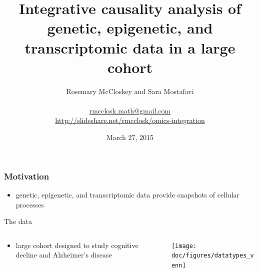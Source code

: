 \documentclass{beamer}
\title[Omics data integration]{Integrative causality analysis of genetic,
epigenetic, and transcriptomic data in a large cohort}
\author[R. McCloskey \& S. Mostafavi]
    {Rosemary McCloskey and Sara Mostafavi \\\hfill\\
     \small
     \url{rmcclosk.math@gmail.com} \\
     \url{http://slideshare.net/rmcclosk/omics-integration}
     \normalsize}
\date{March 27, 2015}
\begin{document}
\maketitle

\begin{frame}
    \frametitle{Motivation}
    \begin{itemize}
        \item genetic, epigenetic, and transcriptomic data provide snapshots of
            cellular processes
    \begin{center}
        \vspace{-0.5cm}
        
    \end{center}
    \end{itemize}
\end{frame}

\begin{frame}{The data}
    \begin{columns}
        \begin{column}{0.35\textwidth}
            \begin{itemize}
                \item large cohort designed to study cognitive decline and
                    Alzheimer's disease
            \end{itemize}
        \end{column}
        \begin{column}{0.7\textwidth}
            \texttt{[image: doc/figures/datatypes\_venn]}
        \end{column}
    \end{columns}
\end{frame}
\end{document}
